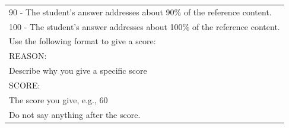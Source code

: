 \begin{table}[ht]
\begin{tabular}{p{13cm}}
90 - The student's answer addresses about 90\% of the reference content. \\
100 - The student's answer addresses about 100\% of the reference content. \\
Use the following format to give a score: \\
REASON: \\
Describe why you give a specific score \\
SCORE: \\
The score you give, e.g., 60 \\
Do not say anything after the score. \\
\bottomrule
\end{tabular}
\label{tab:qa_eval}
\end{table}

